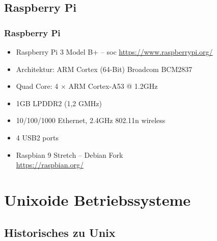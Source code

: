 \documentclass[xcolor=dvipsnames,aspectratio=169]{beamer}
\begin{document}
\subsection{Raspberry Pi}
\begin{frame}
	\frametitle{Raspberry Pi}
\begin{itemize}
	\item Raspberry Pi 3 Model B+ -- \ac{soc} \url{https://www.raspberrypi.org/}
	\item Architektur: ARM Cortex (64-Bit) Broadcom BCM2837
	\item Quad Core: 4 $\times$ ARM Cortex-A53 @ 1.2GHz
	\item 1GB LPDDR2 (1,2 GMHz)
	\item 10/100/1000 Ethernet, 2.4GHz 802.11n wireless
	\item 4 USB2 ports
	\item Raspbian 9 Stretch -- Debian Fork \\ \url{https://raspbian.org/}
\end{itemize}
\end{frame}

\section{Unixoide Betriebssysteme}
\subsection{Historisches zu Unix}
\end{document}
